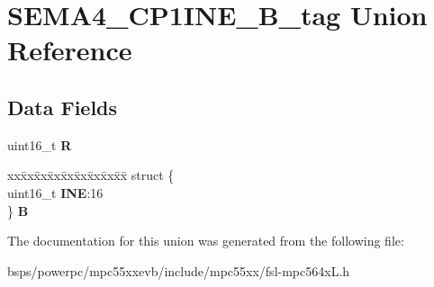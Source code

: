 \hypertarget{unionSEMA4__CP1INE__16B__tag}{}\section{S\+E\+M\+A4\+\_\+\+C\+P1\+I\+N\+E\+\_\+B\+\_\+tag Union Reference}
\label{unionSEMA4__CP1INE__16B__tag}
\subsection*{Data Fields}
\begin{DoxyCompactItemize}
\item 
\mbox{\label{unionSEMA4__CP1INE__16B__tag_ad0e91cd93c8b7b85390c4ee14399f778}} 
uint16\+\_\+t {\bfseries R}
\item 
\mbox{\label{unionSEMA4__CP1INE__16B__tag_add16bbd24f8cdc1d76cb6c6c1b497187}} 
\begin{tabbing}
xx\=xx\=xx\=xx\=xx\=xx\=xx\=xx\=xx\=\kill
struct \{\\
\>uint16\_t {\bfseries INE}:16\\
\} {\bfseries B}\\

\end{tabbing}\end{DoxyCompactItemize}


The documentation for this union was generated from the following file\+:\begin{DoxyCompactItemize}
\item 
bsps/powerpc/mpc55xxevb/include/mpc55xx/fsl-\/mpc564x\+L.\+h\end{DoxyCompactItemize}
